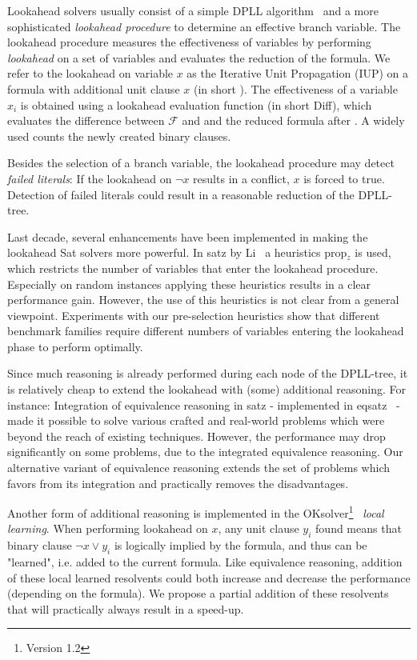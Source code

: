 \documentclass[twoside,11pt]{article}
\begin{document}
Lookahead \Sat solvers usually consist of a simple DPLL algorithm~\cite{Davis:1962} and a more
sophisticated \emph{lookahead procedure} to determine an effective branch variable.
The lookahead procedure measures the effectiveness of variables by performing
\emph{lookahead} on a set of variables and evaluates the reduction of the formula.
We refer to the lookahead on variable $x$ as the Iterative Unit Propagation (IUP) on 
a formula with additional unit clause $x$ (in short ). The effectiveness of a variable $x_i$
is obtained using a lookahead evaluation function (in short {\sc Diff}), which evaluates the difference
between $\mathcal{F}$ and and the reduced formula after . A widely used \Diff
counts the newly created binary clauses.

Besides the selection of a branch variable, the lookahead procedure may detect \emph{failed literals}:
If the lookahead on $\lnot x$ results in a conflict, $x$ is forced to true. Detection of failed literals
could result in a reasonable reduction of the DPLL-tree.

Last decade, several enhancements have been implemented in making the lookahead {\sc Sat} solvers more powerful. 
In {\sf satz} by Li~\cite{Li:1997} a heuristics {\sc prop}$_z$ is used, which restricts the number of 
variables that enter the lookahead procedure. Especially on random instances applying these heuristics 
results in a clear performance gain. However, the use of this heuristics is not clear from a general viewpoint. 
Experiments with our pre-selection heuristics show that different benchmark families 
require different numbers of variables entering the lookahead phase to perform optimally.

Since much reasoning is already performed during each node of the DPLL-tree, it is relatively
cheap to extend the lookahead with (some) additional reasoning. For instance: Integration of equivalence reasoning in 
{\sf satz} - implemented in {\sf eqsatz}~\cite{Li:2000} - made it possible to solve various crafted 
and real-world problems which were beyond the reach of existing techniques.  However, the performance 
may drop significantly on some problems, due to the integrated equivalence reasoning. Our alternative 
variant of equivalence reasoning extends the set of problems which favors from its integration and practically
removes the disadvantages. 

Another form of additional reasoning is implemented in the {\sf OKsolver}\footnote{Version 1.2}~\cite{Kullmann:2002}
\emph{local learning}. When performing lookahead on $x$, any unit clause $y_i$ found means 
that binary clause $\lnot x \lor y_i$ is logically implied by the formula, and thus can be "learned", 
i.e. added to the current formula. Like equivalence reasoning, addition
of these local learned resolvents could both increase and decrease the performance
(depending on the formula). We propose a partial addition of these resolvents
that will practically always result in a speed-up.
\end{document}
